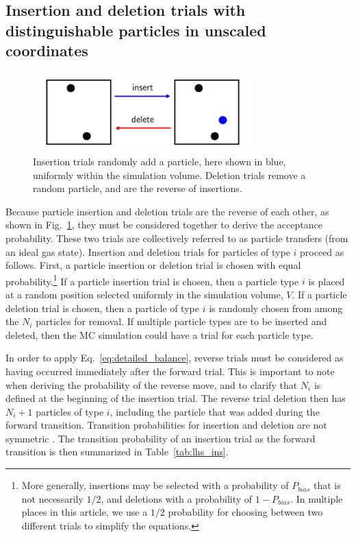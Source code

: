 \documentclass[
  9pt,
  bestpractices,
]{livecoms}
\begin{document}
\subsection{\label{sec:lhs_insdel}Insertion and deletion trials with distinguishable particles in unscaled coordinates}

\begin{figure}
\begin{centering}
\includegraphics[width=8.5cm]{../figures/muvt.pdf}
\caption{
Insertion trials randomly add a particle, here shown in blue, uniformly within the simulation volume.
Deletion trials remove a random particle, and are the reverse of insertions.
}
\label{fig:muvt}
\end{centering}
\end{figure}

Because particle insertion and deletion trials \cite{norman_investigation_1969, adams_grand_1975} are the reverse of each other, as shown in Fig.~\ref{fig:muvt}, they must be considered together to derive the acceptance probability.
These two trials are collectively referred to as particle transfers (from an ideal gas state).
Insertion and deletion trials for particles of type $i$ proceed as follows.
First, a particle insertion or deletion trial is chosen with equal probability.\footnote{More generally, insertions may be selected with a probability of $P_{bias}$ that is not necessarily $1/2$, and deletions with a probability of $1-P_{bias}$.
In multiple places in this article, we use a $1/2$ probability for choosing between two different trials to simplify the equations.}
If a particle insertion trial is chosen, then a particle type $i$ is placed at a random position selected uniformly in the simulation volume, $V$.
If a particle deletion trial is chosen, then a particle of type $i$ is randomly chosen from among the $N_i$ particles for removal.
If multiple particle types are to be inserted and deleted, then the MC simulation could have a trial for each particle type.

In order to apply Eq.~\ref{eq:detailed_balance}, reverse trials must be considered as having occurred immediately after the forward trial.
This is important to note when deriving the probability of the reverse move, and to clarify that $N_i$ is defined at the beginning of the insertion trial.
The reverse trial deletion then has $N_i+1$ particles of type $i$, including the particle that was added during the forward transition.
Transition probabilities for insertion and deletion are not symmetric \cite{norman_investigation_1969, hastings_monte_1970}.
The transition probability of an insertion trial as the forward transition is then summarized in Table~\ref{tab:lhs_ins}.
\end{document}
